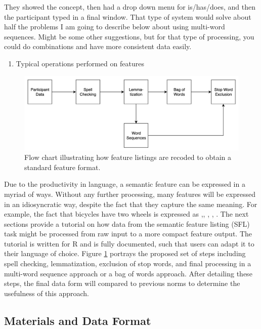 \documentclass[man]{apa6}
\providecommand{\tightlist}{%
  \setlength{\itemsep}{0pt}\setlength{\parskip}{0pt}}
\begin{document}
They showed the concept, then had a drop down menu for is/has/does, and then the participant typed in a final window. That type of system would solve about half the problems I am going to describe below about using multi-word sequences. Might be some other suggestions, but for that type of processing, you could do combinations and have more consistent data easily.

\begin{enumerate}
\def\labelenumi{\arabic{enumi}.}
\setcounter{enumi}{2}
\tightlist
\item
  Typical operations performed on features
\end{enumerate}

\begin{figure}
\includegraphics[width=5.28in]{flow_chart} \caption{Flow chart illustrating how feature listings are recoded to obtain a standard feature format.}\label{fig:flowchart}
\end{figure}

Due to the productivity in language, a semantic feature can be expressed in a myriad of ways. Without any further processing, many features will be expressed in an idiosyncratic way, despite the fact that they capture the same meaning. For example, the fact that bicycles have two wheels is expressed as ,, , , . The next sections provide a tutorial on how data from the semantic feature listing (SFL) task might be processed from raw input to a more compact feature output. The tutorial is written for R and is fully documented, such that users can adapt it to their language of choice. Figure \ref{fig:flowchart} portrays the proposed set of steps including spell checking, lemmatization, exclusion of stop words, and final processing in a multi-word sequence approach or a bag of words approach. After detailing these steps, the final data form will compared to previous norms to determine the usefulness of this approach.

\hypertarget{materials-and-data-format}{%
\subsection{Materials and Data Format}\label{materials-and-data-format}}
\end{document}
